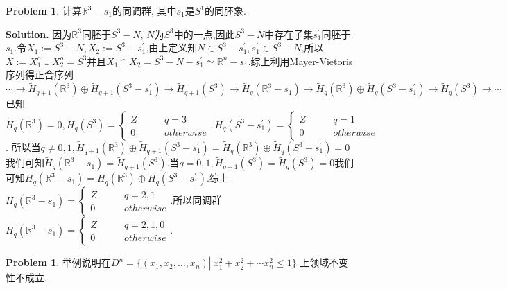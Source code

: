 \documentclass[a4paper]{book}
\newenvironment{solution}%
{\noindent\textbf{Solution.}}%
{\qedhere}
\numberwithin{equation}{chapter}
\theoremstyle{definition}
\newtheorem{pro}[exm]{Problem}
\begin{document}
\begin{pro}
  计算$\mathbb{R}^3 - s_1$的同调群, 其中$s_1$是$S^1$的同胚象.
\end{pro}

\begin{solution}
  因为$\mathbb{R}^3$同胚于$S^3 - N$, $N$为$S^3$中的一点,因此$S^3 - N$中存在子集$ s_1^\prime $同胚于$s_1$.令$X_1 := S^3 - N, X_2 := S^3 - s_1^\prime$,由上定义知$N \in S^3 - s_1^\prime, s_1^\prime \in S^3 - N$,所以$X := X_1^o \cup X_2^o = S^3 $并且$X_1 \cap X_2 = S^3 - N - s_1^\prime \simeq \mathbb{R}^n - s_1$.综上利用Mayer-Vietoris序列得正合序列
  \[\cdots\rightarrow \widetilde{H}_{q+1}(\mathbb{R}^3) \oplus \widetilde{H}_{q+1}(S^3 - s_1^\prime) \rightarrow \widetilde{H}_{q+1}(S^3) \rightarrow \widetilde{H}_q(\mathbb{R}^3 - s_1) \rightarrow \widetilde{H}_q(\mathbb{R}^3) \oplus \widetilde{H}_q(S^3 - s_1^\prime) \rightarrow \widetilde{H}_{q}(S^3) \rightarrow  \cdots \]
  已知$\widetilde{H}_q(\mathbb{R}^3) = 0, \widetilde{H}_q(S^3) =
  \begin{cases}
    Z  \qquad & q = 3 \\
    0  \qquad &otherwise
  \end{cases},
  \widetilde{H}_q(S^3 - s_1^\prime) =
  \begin{cases}
    Z  \qquad & q = 1 \\
    0  \qquad &otherwise
  \end{cases}$.
  所以当$q \not= 0,1,  \widetilde{H}_{q+1}(\mathbb{R}^3) \oplus \widetilde{H}_{q+1}(S^3 - s_1^\prime) =  \widetilde{H}_{q}(\mathbb{R}^3) \oplus \widetilde{H}_{q}(S^3 - s_1^\prime) = 0 $我们可知$\widetilde{H}_q(\mathbb{R}^3 - s_1) = \widetilde{H}_{q+1}(S^3)$.当$q = 0,1,  \widetilde{H}_{q+1}(S^3) =  \widetilde{H}_{q}(S^3) = 0$我们可知$\widetilde{H}_q(\mathbb{R}^3 - s_1)  =  \widetilde{H}_{q}(\mathbb{R}^3) \oplus \widetilde{H}_{q}(S^3 - s_1^\prime) $.综上$\widetilde{H}_q(\mathbb{R}^3 - s_1)  =
  \begin{cases}
    Z \qquad &q = 2,1 \\
    0 &otherwise
  \end{cases}
  $.所以同调群$H_q(\mathbb{R}^3 - s_1) =
  \begin{cases}
    Z \qquad &q = 2,1,0 \\
    0 &otherwise
  \end{cases}
  $.
\end{solution}

\begin{pro}
  举例说明在$D^n = \{(x_1,x_2,\ldots,x_n) \left.\right| \ x_1^2 + x_2^2 + \cdots x_n^2 \leq 1\}$ 上领域不变性不成立.
\end{pro}
\end{document}
